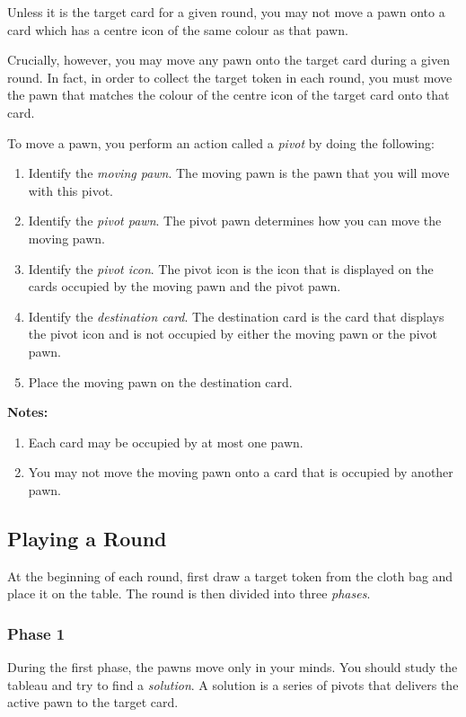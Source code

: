 \documentclass[a6paper, parskip=half, DIV=14, 10pt]{scrartcl}
\begin{document}
Unless it is the target card for a given round, you may not move a pawn onto a card which has a centre icon of the same colour as that pawn.

Crucially, however, you may move any pawn onto the target card during a given round. In fact, in order to collect the target token in each round, you must move the pawn that matches the colour of the centre icon of the target card onto that card.

\newpage

To move a pawn, you perform an action called a \emph{pivot} by doing the following:
\begin{enumerate}[leftmargin=*]
  \item Identify the \emph{moving pawn}. The moving pawn is the pawn that you will move with this pivot.
  \item Identify the \emph{pivot pawn}. The pivot pawn determines how you can move the moving pawn.
  \item Identify the \emph{pivot icon}. The pivot icon is the icon that is displayed on the cards occupied by the moving pawn and the pivot pawn.
  \item Identify the \emph{destination card}. The destination card is the card that displays the pivot icon and is not occupied by either the moving pawn or the pivot pawn.
  \item Place the moving pawn on the destination card.
\end{enumerate}

\textbf{Notes:}
\begin{enumerate}[leftmargin=*]
  \item Each card may be occupied by at most one pawn.
  \item You may not move the moving pawn onto a card that is occupied by another pawn.
\end{enumerate}

\newpage

\subsection*{Playing a Round}
At the beginning of each round, first draw a target token from the cloth bag and place it on the table. The round is then divided into three \emph{phases}.

\subsubsection*{Phase 1}
During the first phase, the pawns move only in your minds. You should study the tableau and try to find a \emph{solution}. A solution is a series of pivots that delivers the active pawn to the target card.
\end{document}
